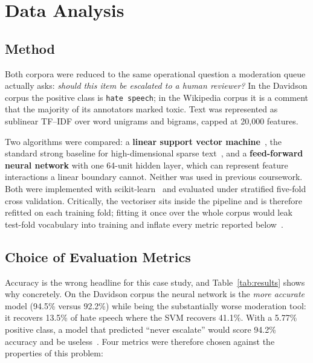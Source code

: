 ﻿%
\section{Data Analysis}
\label{sec:Data Analysis}

\subsection{Method}
\label{subsec:Method}

Both corpora were reduced to the same operational question a moderation queue actually
asks: \emph{should this item be escalated to a human reviewer?} In the Davidson corpus the
positive class is \texttt{hate speech}; in the Wikipedia corpus it is a comment that the
majority of its annotators marked toxic. Text was represented as sublinear TF--IDF over
word unigrams and bigrams, capped at 20,000 features.

Two algorithms were compared: a \textbf{linear support vector
machine}~\cite{cortes1995support}, the standard strong baseline for high-dimensional
sparse text~\cite{joachims1998text}, and a \textbf{feed-forward neural network} with one
64-unit hidden layer, which can represent feature interactions a linear boundary cannot.
Neither was used in previous coursework. Both were implemented with
scikit-learn~\cite{pedregosa2011scikit} and evaluated under stratified five-fold cross
validation. Critically, the vectoriser sits inside the pipeline and is therefore refitted
on each training fold; fitting it once over the whole corpus would leak test-fold
vocabulary into training and inflate every metric reported
below~\cite{pageEvaluating}.

\subsection{Choice of Evaluation Metrics}
\label{subsec:Choice of Evaluation Metrics}

Accuracy is the wrong headline for this case study, and Table~\ref{tab:results} shows why
concretely. On the Davidson corpus the neural network is the \emph{more accurate} model
(94.5\% versus 92.2\%) while being the substantially worse moderation tool: it recovers
13.5\% of hate speech where the SVM recovers 41.1\%. With a 5.77\% positive class, a
model that predicted ``never escalate'' would score 94.2\% accuracy and be
useless~\cite{pageEvaluating}. Four metrics were therefore chosen against the
properties of this problem:


